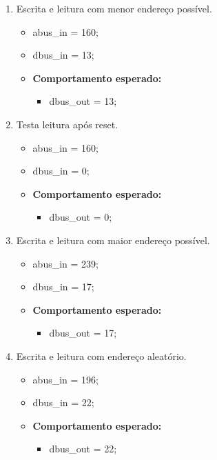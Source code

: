 \documentclass{article}
\begin{document}
\begin{enumerate}
    \item  Escrita e leitura com menor endereço possível.
    \begin{itemize}
        \item abus\_in = 160;
        \item dbus\_in = 13;
        \item \textbf{Comportamento esperado:}
        \begin{itemize}
            \item dbus\_out = 13;
        \end{itemize}
    \end{itemize}
    
    \item Testa leitura após reset.
    \begin{itemize}
        \item abus\_in = 160;
        \item dbus\_in = 0;
        \item \textbf{Comportamento esperado:}
        \begin{itemize}
            \item dbus\_out = 0;
        \end{itemize}
    \end{itemize}

    \item  Escrita e leitura com maior endereço possível.
    \begin{itemize}
        \item abus\_in = 239;
        \item dbus\_in = 17;
        \item \textbf{Comportamento esperado:}
        \begin{itemize}
            \item dbus\_out = 17;
        \end{itemize}
    \end{itemize}

    \item  Escrita e leitura com endereço aleatório.
    \begin{itemize}
        \item abus\_in = 196;
        \item dbus\_in = 22;
        \item \textbf{Comportamento esperado:}
        \begin{itemize}
            \item dbus\_out = 22;
        \end{itemize}
    \end{itemize}
\end{enumerate}
\end{document}
